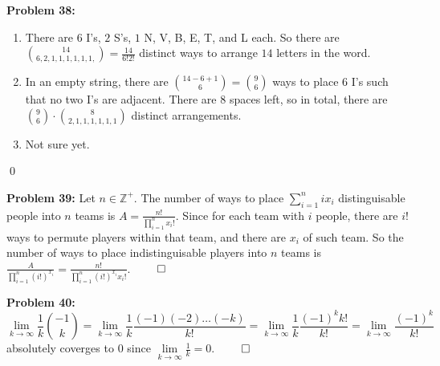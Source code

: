 \documentclass[12pt]{article}
\newcommand{\Z}{\mathbb{Z}}
\newcommand{\prob}[1]{\textbf{Problem #1:}}
\begin{document}
\prob{38}
\begin{enumerate}[label=(\alph*)]
    \item There are $6$ I's, $2$ S's, $1$ N, V, B, E, T, and L each. So there are $\binom{14}{6,2,1,1,1,1,1,1,} = \frac{14}{6!2!}$ distinct ways to arrange $14$ letters in the word.
    \item In an empty string, there are $\binom{14-6+1}{6} = \binom{9}{6}$ ways to place $6$ I's such that no two I's are adjacent. There are $8$ spaces left, so in total, there are $\binom{9}{6} \cdot \binom{8}{2, 1,1,1,1,1,1}$ distinct arrangements.


        

    \item Not sure yet.
\end{enumerate} \qed

\prob{39} Let $n \in \Z^+$. The number of ways to place $\sum\limits_{i=1}^n i x_i$ distinguisable people into $n$ teams is $A = \frac{n!}{\prod\limits^n_{i=1} x_i!}$. Since for each team with $i$ people, there are $i!$ ways to permute players within that team, and there are $x_i$ of such team. So the number of ways to place indistinguisable players into $n$ teams is $\frac{A}{\prod\limits^n_{i=1} (i!)^{x_i}} = \frac{n!}{\prod\limits^n_{i=1} (i!)^{x_i}x_i!}$. $\qed$

\prob{40}
\[
\lim\limits_{k \to \infty} \frac{1}{k} \binom{-1}{k} = \lim\limits_{k \to \infty} \frac{1}{k} \frac{(-1) (-2)\dots (-k)}{k!}
= \lim\limits_{k \to \infty} \frac{1}{k} \frac{(-1)^k k!}{k!}
= \lim\limits_{k \to \infty} \frac{(-1)^k}{k!}
\]
absolutely coverges to $0$ since $\lim\limits_{k \to \infty} \frac{1}{k} = 0$. $\qed$
\end{document}
